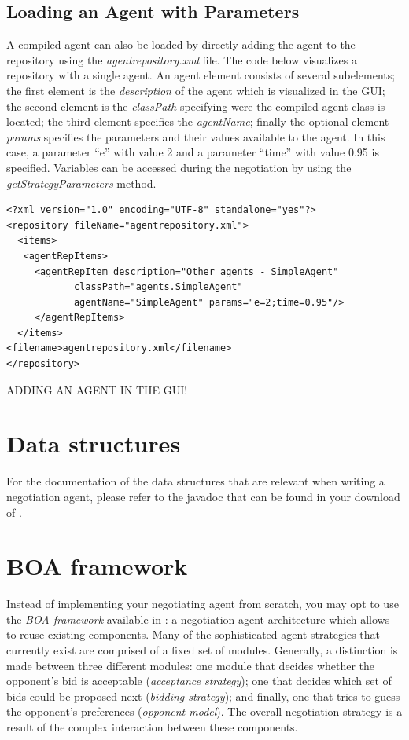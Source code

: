\documentclass[]{article}
\begin{document}
\subsection{Loading an Agent with Parameters}
A compiled agent can also be loaded by directly adding the agent to the repository using the \textit{agentrepository.xml} file. The code below visualizes a repository with a single agent. An agent element consists of several subelements; the first element is the \textit{description} of the agent which is visualized in the GUI; the second element is the \textit{classPath} specifying were the compiled agent class is located; the third element specifies the \textit{agentName}; finally the optional element \textit{params} specifies the parameters and their values available to the agent. In this case, a parameter ``e'' with value 2 and a parameter ``time'' with value 0.95 is specified. Variables can be accessed during the negotiation by using the \textit{getStrategyParameters} method.

\begin{lstlisting}
<?xml version="1.0" encoding="UTF-8" standalone="yes"?>
<repository fileName="agentrepository.xml">
  <items>
   <agentRepItems>
     <agentRepItem description="Other agents - SimpleAgent"
			classPath="agents.SimpleAgent"
			agentName="SimpleAgent" params="e=2;time=0.95"/>
     </agentRepItems>
  </items>
<filename>agentrepository.xml</filename>
</repository>
\end{lstlisting}
 
ADDING AN AGENT IN THE GUI!

\section{Data structures}
For the documentation of the data structures that are relevant when writing a negotiation agent, please refer to the javadoc that can be found in your download of \Genius. 

\section{BOA framework}
Instead of implementing your negotiating agent from scratch, you may opt to use the \textit{BOA framework} available in \Genius: a negotiation agent architecture which allows to reuse existing components. Many of the sophisticated agent strategies that currently exist are comprised of a fixed set of modules. Generally, a distinction is made between three different modules: one module that decides whether the opponent's bid is acceptable (\textit{acceptance strategy}); one that decides which set of bids could be proposed next (\textit{bidding strategy}); and finally, one that tries to guess the opponent's preferences (\textit{opponent model}). The overall negotiation strategy is a result of the complex interaction between these components.
\end{document}
